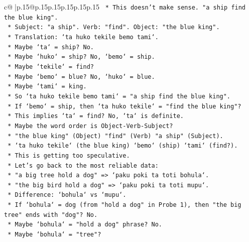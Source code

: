 \documentclass{article}
\begin{document}
{\begin{supertabular}{c@{$\;$}|p{.15\linewidth}@{}p{.15\linewidth}p{.15\linewidth}p{.15\linewidth}p{.15\linewidth}p{.15\linewidth}}
{{{\texttt{                    *   This doesn't make sense. "a ship find the blue king".} \\
\texttt{                    *   Subject: "a ship". Verb: "find". Object: "the blue king".} \\
\texttt{                    *   Translation: `ta huko tekile bemo tami`.} \\
\texttt{                    *   Maybe `ta` = ship? No.} \\
\texttt{                    *   Maybe `huko` = ship? No, `bemo` = ship.} \\
\texttt{                    *   Maybe `tekile` = find?} \\
\texttt{                    *   Maybe `bemo` = blue? No, `huko` = blue.} \\
\texttt{                    *   Maybe `tami` = king.} \\
\texttt{                    *   So `ta huko tekile bemo tami` = "a ship find the blue king".} \\
\texttt{                    *   If `bemo` = ship, then `ta huko tekile` = "find the blue king"?} \\
\texttt{                    *   This implies `ta` = find? No, `ta` is definite.} \\
\texttt{                    *   Maybe the word order is Object{-}Verb{-}Subject?} \\
\texttt{                    *   "the blue king" (Object) "find" (Verb) "a ship" (Subject).} \\
\texttt{                    *   `ta huko tekile` (the blue king) `bemo` (ship) `tami` (find?).} \\
\texttt{                    *   This is getting too speculative.} \\
\texttt{                *   Let's go back to the most reliable data:} \\
\texttt{                    *   "a big tree hold a dog" => `paku poki ta toti bohula`.} \\
\texttt{                    *   "the big bird hold a dog" => `paku poki ta toti mupu`.} \\
\texttt{                    *   Difference: `bohula` vs `mupu`.} \\
\texttt{                    *   If `bohula` = dog (from "hold a dog" in Probe 1), then "the big tree" ends with "dog"? No.} \\
\texttt{                    *   Maybe `bohula` = "hold a dog" phrase? No.} \\
\texttt{                    *   Maybe `bohula` = "tree"?} \\
}}}
\end{supertabular}}
\end{document}
